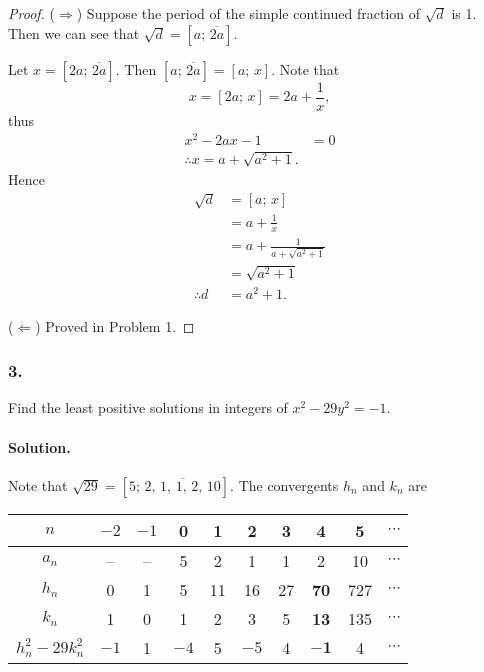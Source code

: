 \begin{proof}
    ($\Rightarrow$) Suppose the period of the simple continued fraction of $\sqrt{d}$ is 1. Then we can see that
    $\sqrt{d} = \left[a;\,\overline{2a}\right]$.

    Let $x=\left[2a;\,\overline{2a}\right]$. Then $\left[a;\,\overline{2a}\right]=\left[a;\,x\right]$. Note that
    \[
        x=\left[ 2a;\,x \right] = 2a+\frac{1}{x},
    \]
    thus
    \begin{align*}
        x^2-2ax-1&=0\\
        \therefore x=a+\sqrt{a^2+1}.
    \end{align*}
    Hence
    \begin{align*}
        \sqrt{d} &= \left[a;\,x\right] \\
        &= a+\frac{1}{x} \\
        &= a+\frac{1}{a+\sqrt{a^2+1}} \\
        &= \sqrt{a^2+1} \\
        \therefore d&=a^2+1.
    \end{align*}

    ($\Leftarrow$) Proved in Problem 1.
\end{proof}

\subsubsection{3.} Find the least positive solutions in integers of $x^2-29y^2=-1$.

\paragraph{Solution.} Note that $\sqrt{29}=\left[5;\,\overline{2,\,1,\,1,\,2,\,10}\right]$. The convergents $h_n$ and $k_n$ are

\begin{center}
    \begin{tabular}{c|ccccccccc}
    \hline
    $n$ & $-2$ & $-1$ & 0 & 1 & 2 & 3 & 4 & 5 & $\cdots$ \\
    \hline
    $a_n$ & -- & -- & 5 & 2  & 1  & 1  & 2  & 10 & $\cdots$ \\
    \hline
    $h_n$ & 0  & 1  & 5 & 11 & 16 & 27 & \textbf{70} & 727 & $\cdots$ \\
    $k_n$ & 1  & 0  & 1 & 2  & 3  & 5  & \textbf{13} & 135 & $\cdots$ \\
    \hline
    $h_n^2-29k_n^2$ & $-1$ & 1 & $-4$ & 5 & $-5$ & 4 & $\mathbf{-1}$ & 4 & $\cdots$ \\
    \hline
    \end{tabular}
\end{center}


